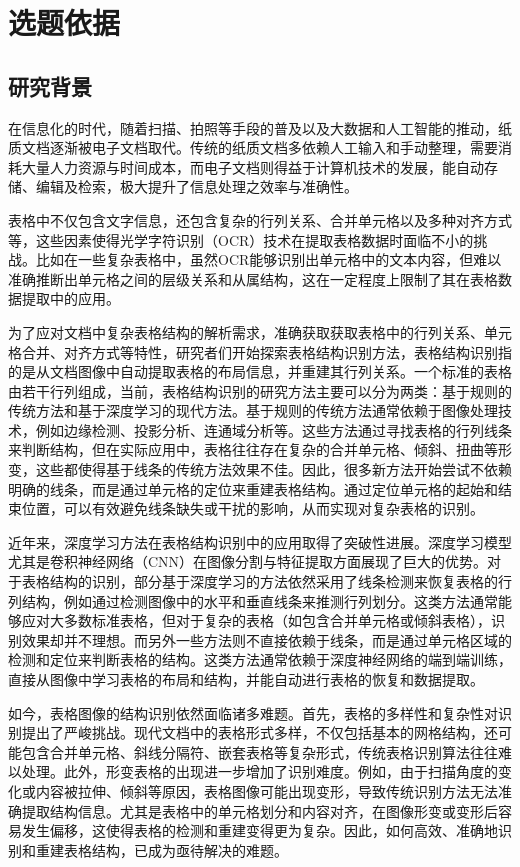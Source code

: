 \documentclass[UTF8,12pt, AutoFakeBold,fontset = founder]{ctexart}
\begin{document}
\section{选题依据}

\subsection{研究背景}

在信息化的时代，随着扫描、拍照等手段的普及以及大数据和人工智能的推动，纸质文档逐渐被电子文档取代。传统的纸质文档多依赖人工输入和手动整理，需要消耗大量人力资源与时间成本，而电子文档则得益于计算机技术的发展，能自动存储、编辑及检索，极大提升了信息处理之效率与准确性。

表格中不仅包含文字信息，还包含复杂的行列关系、合并单元格以及多种对齐方式等，这些因素使得光学字符识别（OCR）\cite{b1, b2}技术在提取表格数据时面临不小的挑战。比如在一些复杂表格中，虽然OCR能够识别出单元格中的文本内容，但难以准确推断出单元格之间的层级关系和从属结构，这在一定程度上限制了其在表格数据提取中的应用。

为了应对文档中复杂表格结构的解析需求，准确获取获取表格中的行列关系、单元格合并、对齐方式等特性，研究者们开始探索表格结构识别方法，表格结构识别指的是从文档图像中自动提取表格的布局信息，并重建其行列关系。一个标准的表格由若干行列组成，当前，表格结构识别的研究方法主要可以分为两类：基于规则的传统方法和基于深度学习的现代方法。基于规则的传统方法通常依赖于图像处理技术，例如边缘检测、投影分析、连通域分析等\cite{b3}。这些方法通过寻找表格的行列线条来判断结构，但在实际应用中，表格往往存在复杂的合并单元格、倾斜、扭曲等形变，这些都使得基于线条的传统方法效果不佳。因此，很多新方法开始尝试不依赖明确的线条，而是通过单元格的定位来重建表格结构。通过定位单元格的起始和结束位置，可以有效避免线条缺失或干扰的影响，从而实现对复杂表格的识别。

近年来，深度学习方法在表格结构识别中的应用取得了突破性进展\cite{b3}。深度学习模型尤其是卷积神经网络（CNN）在图像分割与特征提取方面展现了巨大的优势。对于表格结构的识别，部分基于深度学习的方法依然采用了线条检测来恢复表格的行列结构，例如通过检测图像中的水平和垂直线条来推测行列划分。这类方法通常能够应对大多数标准表格，但对于复杂的表格（如包含合并单元格或倾斜表格），识别效果却并不理想。而另外一些方法则不直接依赖于线条，而是通过单元格区域的检测和定位来判断表格的结构\cite{b3}。这类方法通常依赖于深度神经网络的端到端训练，直接从图像中学习表格的布局和结构，并能自动进行表格的恢复和数据提取。

如今，表格图像的结构识别依然面临诸多难题。首先，表格的多样性和复杂性对识别提出了严峻挑战。现代文档中的表格形式多样，不仅包括基本的网格结构，还可能包含合并单元格、斜线分隔符、嵌套表格等复杂形式，传统表格识别算法往往难以处理。此外，形变表格的出现进一步增加了识别难度。例如，由于扫描角度的变化或内容被拉伸、倾斜等原因，表格图像可能出现变形，导致传统识别方法无法准确提取结构信息。尤其是表格中的单元格划分和内容对齐，在图像形变或变形后容易发生偏移，这使得表格的检测和重建变得更为复杂。因此，如何高效、准确地识别和重建表格结构，已成为亟待解决的难题。
\end{document}
